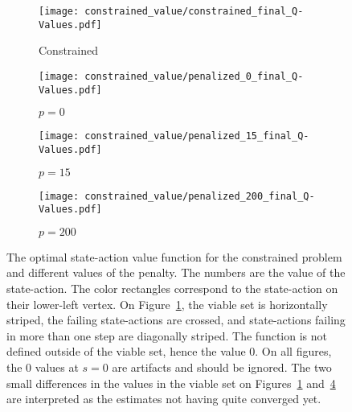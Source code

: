 \begin{figure}
	\centering
	\begin{subfigure}{0.45\textwidth}
		\centering
		\texttt{[image: constrained\_value/constrained\_final\_Q-Values.pdf]}
		\caption{Constrained}
		\label{fig:hovership q values:constrained}
	\end{subfigure}
	\begin{subfigure}{0.45\textwidth}
		\centering
		\texttt{[image: constrained\_value/penalized\_0\_final\_Q-Values.pdf]}
		\caption{$p=0$}
		\label{fig:hovership q values:0}
	\end{subfigure}
	\newline
	\begin{subfigure}{0.45\textwidth}
		\centering
		\texttt{[image: constrained\_value/penalized\_15\_final\_Q-Values.pdf]}
		\caption{$p=15$}
		\label{fig:hovership q values:15}
	\end{subfigure}
	\begin{subfigure}{0.45\textwidth}
		\centering
		\texttt{[image: constrained\_value/penalized\_200\_final\_Q-Values.pdf]}
		\caption{$p=200$}
		\label{fig:hovership q values:200}
	\end{subfigure}
	\caption{The optimal state-action value function for the constrained problem and different values of the penalty. The numbers are the value of the state-action. The color rectangles correspond to the state-action on their lower-left vertex. On Figure~\ref{fig:hovership q values:constrained}, the viable set is horizontally striped, the failing state-actions are crossed, and state-actions failing in more than one step are diagonally striped. The function is not defined outside of the viable set, hence the value $0$. On all figures, the $0$ values at $s=0$ are artifacts and should be ignored. The two small differences in the values in the viable set on Figures~\ref{fig:hovership q values:constrained} and~\ref{fig:hovership q values:200} are interpreted as the estimates not having quite converged yet.}
	\label{fig:hovership q values}
\end{figure}
